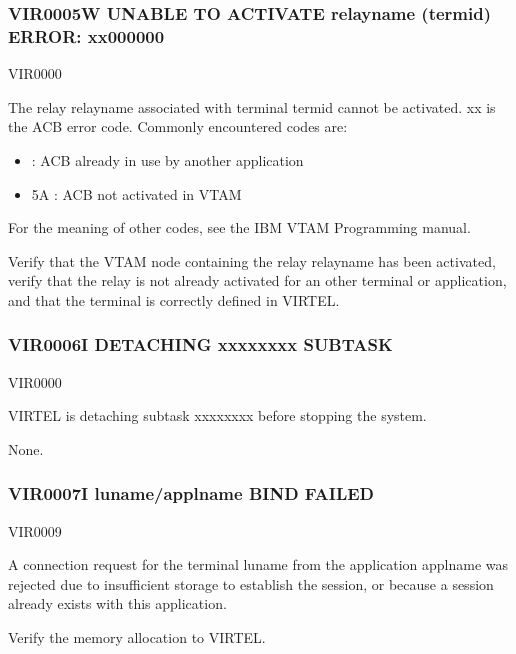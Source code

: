 \documentclass[letterpaper,10pt,english]{sphinxmanual}
\begin{document}
\subsubsection{VIR0005W UNABLE TO ACTIVATE relayname (termid) ERROR: xx000000}
\label{\detokenize{messages:vir0005w-unable-to-activate-relayname-termid-error-xx000000}}\begin{description}
\sphinxAtStartPar
VIR0000

\sphinxAtStartPar
The relay relayname associated with terminal termid cannot be activated. xx is the ACB error code. Commonly encountered codes are:
\begin{itemize}
\item {} 
 : ACB already in use by another application

\item {} 
\sphinxAtStartPar
5A : ACB not activated in VTAM

\end{itemize}

\sphinxAtStartPar
For the meaning of other codes, see the IBM VTAM Programming manual.

\sphinxAtStartPar
Verify that the VTAM node containing the relay relayname has been activated, verify that the relay is not already activated for an other terminal or application, and that the terminal is correctly defined in VIRTEL.

\end{description}


\subsubsection{VIR0006I DETACHING xxxxxxxx SUBTASK}
\label{\detokenize{messages:vir0006i-detaching-xxxxxxxx-subtask}}\begin{description}
\sphinxAtStartPar
VIR0000

\sphinxAtStartPar
VIRTEL is detaching subtask xxxxxxxx before stopping the system.

\sphinxAtStartPar
None.

\end{description}


\subsubsection{VIR0007I luname/applname BIND FAILED}
\label{\detokenize{messages:vir0007i-luname-applname-bind-failed}}\begin{description}
\sphinxAtStartPar
VIR0009

\sphinxAtStartPar
A connection request for the terminal luname from the application applname was rejected due to insufficient storage to establish the session, or because a session already exists with this application.

\sphinxAtStartPar
Verify the memory allocation to VIRTEL.

\end{description}
\end{document}
